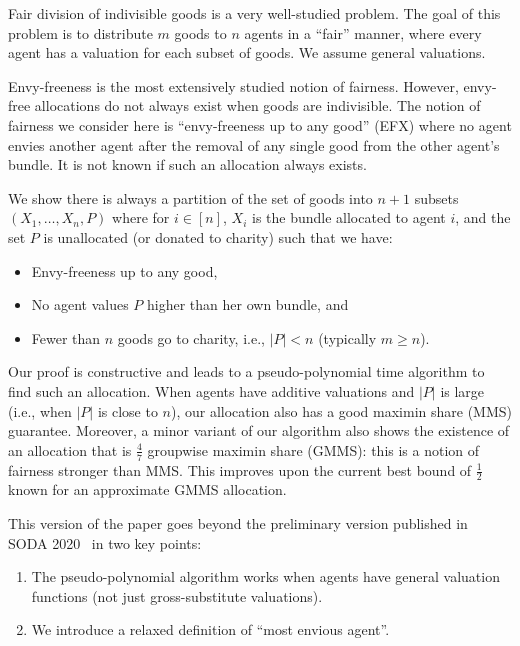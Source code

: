 \documentclass{article}
\begin{document}
Fair division of indivisible goods is a very well-studied problem. The goal of this problem is to distribute $m$ goods to $n$ agents in a “fair” manner, where every agent has a valuation for each subset of goods. We assume general valuations.

Envy-freeness is the most extensively studied notion of fairness. However, envy-free allocations do not always exist when goods are indivisible. The notion of fairness we consider here is “envy-freeness up to any good” (EFX) where no agent envies another agent after the removal of any single good from the other agent’s bundle. It is not known if such an allocation always exists.

We show there is always a partition of the set of goods into $n + 1$ subsets $(X_1, \ldots, X_n, P)$ where for $i \in [n]$, $X_i$ is the bundle allocated to agent $i$, and the set $P$ is unallocated (or donated to charity) such that we have:
\begin{itemize}
    \item Envy-freeness up to any good,
    \item No agent values $P$ higher than her own bundle, and
    \item Fewer than $n$ goods go to charity, i.e., $|P| < n$ (typically $m \geq n$).
\end{itemize}

Our proof is constructive and leads to a pseudo-polynomial time algorithm to find such an allocation. When agents have additive valuations and $|P|$ is large (i.e., when $|P|$ is close to $n$), our allocation also has a good maximin share (MMS) guarantee. Moreover, a minor variant of our algorithm also shows the existence of an allocation that is $\frac{4}{7}$ groupwise maximin share (GMMS): this is a notion of fairness stronger than MMS. This improves upon the current best bound of $\frac{1}{2}$ known for an approximate GMMS allocation.

This version of the paper goes beyond the preliminary version published in SODA 2020~\cite{SODA2020} in two key points:
\begin{enumerate}
    \item The pseudo-polynomial algorithm works when agents have general valuation functions (not just gross-substitute valuations).
    \item We introduce a relaxed definition of “most envious agent”.
\end{enumerate}
\end{document}
